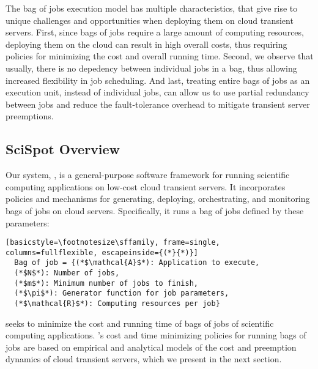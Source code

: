 

The bag of jobs execution model has multiple characteristics, that give rise to unique challenges and opportunities when deploying them on cloud transient servers. 
First, since bags of jobs require a large amount of computing resources, deploying them on the cloud can result in high overall costs, thus requiring policies for minimizing the cost and overall running time. 
Second, we observe that usually, there is no depedency between individual jobs in a bag, thus allowing increased flexibility in job scheduling.
And last, treating entire bags of jobs as an execution unit, instead of individual jobs, can allow us to use partial redundancy between jobs and reduce the fault-tolerance overhead to mitigate transient server preemptions. 


\subsection{SciSpot Overview}

Our system, \sysname, is a general-purpose software framework for running scientific computing applications on low-cost cloud transient servers.
It incorporates policies and mechanisms for generating, deploying, orchestrating, and monitoring bags of jobs on cloud servers.
Specifically, it runs a bag of jobs defined by these parameters:
\begin{lstlisting}[basicstyle=\footnotesize\sffamily, frame=single, columns=fullflexible, escapeinside={(*}{*)}]
  Bag of job = {(*$\mathcal{A}$*): Application to execute,
  (*$N$*): Number of jobs,
  (*$m$*): Minimum number of jobs to finish,
  (*$\pi$*): Generator function for job parameters,
  (*$\mathcal{R}$*): Computing resources per job}
\end{lstlisting}



\sysname seeks to minimize the cost and running time of bags of jobs of scientific computing applications.
\sysname's cost and time minimizing policies for running bags of jobs are based on empirical and analytical models of the cost and preemption dynamics of cloud transient servers, which we present in the next section. 



